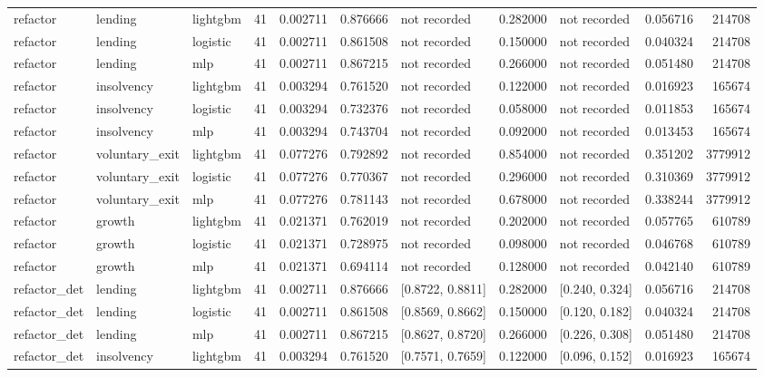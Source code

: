 \begin{table}
{\begin{tabular}{lllrrrlrlrr}
refactor & lending & lightgbm & 41 & 0.002711 & 0.876666 & not recorded & 0.282000 & not recorded & 0.056716 & 214708 \\
refactor & lending & logistic & 41 & 0.002711 & 0.861508 & not recorded & 0.150000 & not recorded & 0.040324 & 214708 \\
refactor & lending & mlp & 41 & 0.002711 & 0.867215 & not recorded & 0.266000 & not recorded & 0.051480 & 214708 \\
refactor & insolvency & lightgbm & 41 & 0.003294 & 0.761520 & not recorded & 0.122000 & not recorded & 0.016923 & 165674 \\
refactor & insolvency & logistic & 41 & 0.003294 & 0.732376 & not recorded & 0.058000 & not recorded & 0.011853 & 165674 \\
refactor & insolvency & mlp & 41 & 0.003294 & 0.743704 & not recorded & 0.092000 & not recorded & 0.013453 & 165674 \\
refactor & voluntary_exit & lightgbm & 41 & 0.077276 & 0.792892 & not recorded & 0.854000 & not recorded & 0.351202 & 3779912 \\
refactor & voluntary_exit & logistic & 41 & 0.077276 & 0.770367 & not recorded & 0.296000 & not recorded & 0.310369 & 3779912 \\
refactor & voluntary_exit & mlp & 41 & 0.077276 & 0.781143 & not recorded & 0.678000 & not recorded & 0.338244 & 3779912 \\
refactor & growth & lightgbm & 41 & 0.021371 & 0.762019 & not recorded & 0.202000 & not recorded & 0.057765 & 610789 \\
refactor & growth & logistic & 41 & 0.021371 & 0.728975 & not recorded & 0.098000 & not recorded & 0.046768 & 610789 \\
refactor & growth & mlp & 41 & 0.021371 & 0.694114 & not recorded & 0.128000 & not recorded & 0.042140 & 610789 \\
refactor_det & lending & lightgbm & 41 & 0.002711 & 0.876666 & [0.8722, 0.8811] & 0.282000 & [0.240, 0.324] & 0.056716 & 214708 \\
refactor_det & lending & logistic & 41 & 0.002711 & 0.861508 & [0.8569, 0.8662] & 0.150000 & [0.120, 0.182] & 0.040324 & 214708 \\
refactor_det & lending & mlp & 41 & 0.002711 & 0.867215 & [0.8627, 0.8720] & 0.266000 & [0.226, 0.308] & 0.051480 & 214708 \\
refactor_det & insolvency & lightgbm & 41 & 0.003294 & 0.761520 & [0.7571, 0.7659] & 0.122000 & [0.096, 0.152] & 0.016923 & 165674 \\

\end{tabular}}
\end{table}
